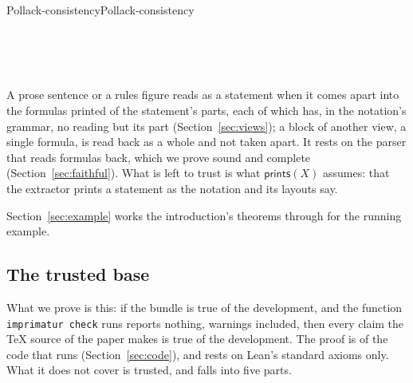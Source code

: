 \documentclass[acmsmall,screen,review,anonymous,nonacm]{acmart}
\begin{document}
\begin{leandef}[sum=KV3oBaXryx, dflt=vAoQO3qBuI]{Pollack-consistency}{Pollack-consistency}
\begin{LeanDisplay}
\\
\\
\\
\end{LeanDisplay}
\end{leandef}

\noindent A prose sentence or a rules figure reads as a statement when it
comes apart into the formulas printed of the statement's parts, each of
which has, in the notation's grammar, no reading but its part
(Section~\ref{sec:views}); a block of another view, a single formula, is
read back as a whole and not taken apart. It rests on the parser that reads formulas back,
which we prove sound and complete (Section~\ref{sec:faithful}). What is left
to trust is what $\mathsf{prints}(X)$ assumes: that the extractor prints a
statement as the notation and its layouts say.

Section~\ref{sec:example} works the introduction's theorems through for
the running example.

\subsection{The trusted base}\label{sec:trusted}

What we prove is this: if the bundle is true of the development, and the
function \verb|imprimatur check| runs reports nothing, warnings included,
then every claim the \TeX{} source of the paper makes is true of the
development. The proof is of the code that runs (Section~\ref{sec:code}), and rests on Lean's
standard axioms only. What it does not cover is trusted, and falls into
five parts.
\end{document}
